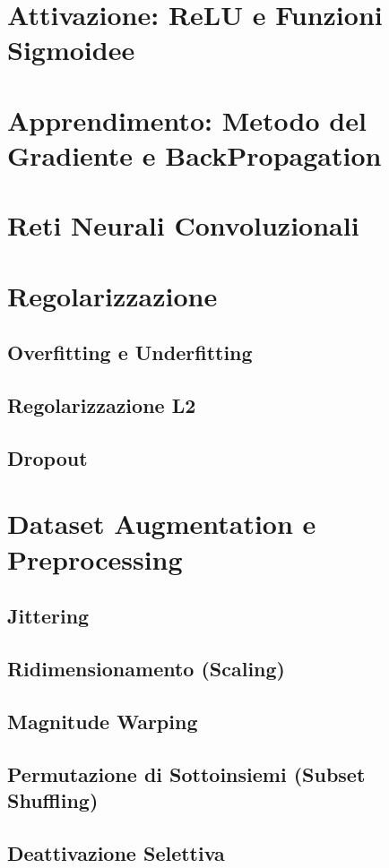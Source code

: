 \documentclass[12pt]{report}
\begin{document}
\section{Attivazione: ReLU e Funzioni Sigmoidee}
\section{Apprendimento: Metodo del Gradiente e BackPropagation}
\section{Reti Neurali Convoluzionali}
\section{Regolarizzazione}
\subsection{Overfitting e Underfitting}
\subsection{Regolarizzazione L2}
\subsection{Dropout}
\section{Dataset Augmentation e Preprocessing}
\subsection{Jittering}
\subsection{Ridimensionamento (Scaling)}
\subsection{Magnitude Warping}
\subsection{Permutazione di Sottoinsiemi (Subset Shuffling)}
\subsection{Deattivazione Selettiva}
\end{document}
